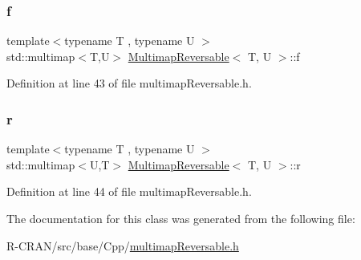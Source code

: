 \mbox{\label{classMultimapReversable_a35385c8878f1f1a749b99e3a788b2a9d}} 
\subsubsection{\texorpdfstring{f}{f}}
{\footnotesize\ttfamily template$<$typename T , typename U $>$ \\
std\+::multimap$<$T,U$>$ \hyperlink{classMultimapReversable}{Multimap\+Reversable}$<$ T, U $>$\+::f\hspace{0.3cm}{\ttfamily [private]}}



Definition at line 43 of file multimap\+Reversable.\+h.

\mbox{\label{classMultimapReversable_ae8f632be1baa742b2f72a69c49c34f2d}} 
\subsubsection{\texorpdfstring{r}{r}}
{\footnotesize\ttfamily template$<$typename T , typename U $>$ \\
std\+::multimap$<$U,T$>$ \hyperlink{classMultimapReversable}{Multimap\+Reversable}$<$ T, U $>$\+::r\hspace{0.3cm}{\ttfamily [private]}}



Definition at line 44 of file multimap\+Reversable.\+h.



The documentation for this class was generated from the following file\+:\begin{DoxyCompactItemize}
\item 
R-\/\+C\+R\+A\+N/src/base/\+Cpp/\hyperlink{multimapReversable_8h}{multimap\+Reversable.\+h}\end{DoxyCompactItemize}
